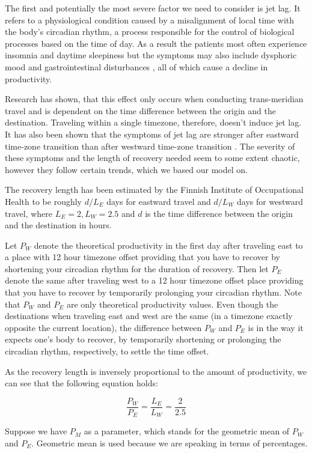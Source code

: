 
The first and potentially the most severe factor we need to consider is jet lag. It refers to a physiological condition caused by a misalignment of local time with the body's circadian rhythm, a process responsible for the control of biological processes based on the time of day. As a result the patients most often experience insomnia and daytime sleepiness but the symptoms may also include dysphoric mood and gastrointestinal disturbances \cite{Sack2010}, all of which cause a decline in productivity.

Research \cite{Cho} has shown, that this effect only occurs when conducting trans-meridian travel and is dependent on the time difference between the origin and the destination. Traveling within a single timezone, therefore, doesn't induce jet lag. It has also been shown that the symptoms of jet lag are stronger after eastward time-zone transition than after westward time-zone transition \cite{Lemmer2002}. The severity of these symptoms and the length of recovery needed seem to some extent chaotic, however they follow certain trends, which we based our model on. 

The recovery length has been estimated by the Finnish Institute of Occupational Health to be roughly $d/L_E$ days for eastward travel and $d/L_W$ days for westward travel, where $L_E = 2, L_W = 2.5$ and $d$ is the time difference between the origin and the destination in hours.

Let $P_W$ denote the theoretical productivity in the first day after traveling east to a place with 12 hour timezone offset providing that you have to recover by shortening your circadian rhythm for the duration of recovery. Then let $P_E$ denote the same after traveling west to a 12 hour timezone offset place providing that you have to recover by temporarily prolonging your circadian rhythm. Note that $P_W$ and $P_E$ are only theoretical productivity values. Even though the destinations when traveling east and west are the same (in a timezone exactly opposite the current location), the difference between $P_W$ and $P_E$ is in the way it expects one's body to recover, by temporarily shortening or prolonging the circadian rhythm, respectively, to settle the time offset.

As the recovery length is inversely proportional to the amount of productivity, we can see that the following equation holds:

$$\frac{P_W}{P_E} = \frac{L_E}{L_W} = \frac{2}{2.5}$$

Suppose we have $P_M$ as a parameter, which stands for the geometric mean of $P_W$ and $P_E$. Geometric mean is used because we are speaking in terms of percentages.

